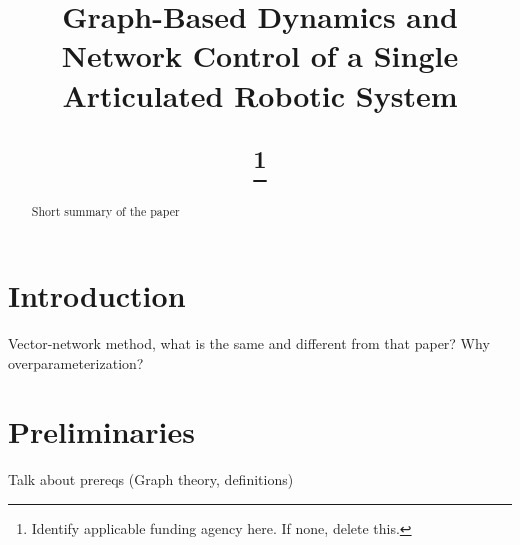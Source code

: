 \documentclass[conference]{article} %
\begin{document}
\title{

Graph-Based Dynamics and Network Control of a Single Articulated Robotic System


\thanks{Identify applicable funding agency here. If none, delete this.}
}

\author{
\and
{}
}

\maketitle

\begin{abstract}
Short summary of the paper
\end{abstract}

\section{Introduction}
Vector-network method, what is the same and different from that paper?
Why overparameterization?

\section{Preliminaries}
Talk about prereqs (Graph theory, definitions)
\end{document}
